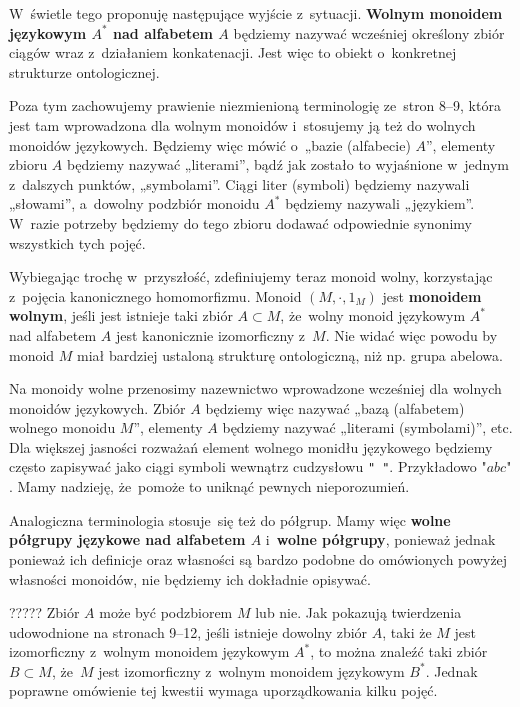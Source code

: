 \documentclass[a4paper,11pt]{article}
\begin{document}
W~świetle tego proponuję następujące wyjście z~sytuacji.
\textbf{Wolnym monoidem językowym $A^{ * }$ nad alfabetem $A$}
będziemy nazywać wcześniej określony zbiór ciągów wraz z~działaniem
konkatenacji. Jest więc to obiekt o~konkretnej strukturze
ontologicznej.

Poza tym zachowujemy prawienie niezmienioną terminologię ze~stron 8--9,
która jest tam wprowadzona dla wolnym monoidów i~stosujemy ją też do
wolnych monoidów językowych. Będziemy więc mówić o~„bazie (alfabecie) $A$”,
elementy zbioru $A$ będziemy nazywać „literami”, bądź jak zostało to
wyjaśnione w~jednym z~dalszych punktów, „symbolami”. Ciągi liter (symboli)
będziemy nazywali „słowami”, a~dowolny podzbiór monoidu $A^{ * }$ będziemy
nazywali „językiem”. W~razie potrzeby będziemy do tego zbioru dodawać
odpowiednie synonimy wszystkich tych pojęć.

Wybiegając trochę w~przyszłość, zdefiniujemy teraz monoid wolny, korzystając
z~pojęcia kanonicznego homomorfizmu. Monoid $( M, \cdot, 1_{ M } )$ jest
\textbf{monoidem wolnym}, jeśli jest istnieje taki zbiór $A \subset M$, że~wolny
monoid językowym $A^{ * }$ nad alfabetem $A$ jest kanonicznie izomorficzny
z~$M$. Nie widać więc powodu by monoid $M$ miał bardziej ustaloną strukturę
ontologiczną, niż np. grupa abelowa.

Na monoidy wolne przenosimy nazewnictwo wprowadzone wcześniej dla wolnych
monoidów językowych. Zbiór $A$ będziemy więc nazywać „bazą (alfabetem)
wolnego monoidu $M$”, elementy $A$ będziemy nazywać „literami (symbolami)”,
etc. Dla większej jasności rozważań element wolnego monidłu językowego
będziemy często zapisywać jako ciągi symboli wewnątrz cudzysłowu
\texttt{" "}. Przykładowo $\texttt{"} abc \texttt{"}$. Mamy nadzieję,
że~pomoże to uniknąć pewnych nieporozumień.

Analogiczna terminologia stosuje~się też do półgrup. Mamy więc \textbf{wolne
  półgrupy językowe nad alfabetem $A$} i~\textbf{wolne półgrupy}, ponieważ
jednak ponieważ ich definicje oraz własności są bardzo podobne do
omówionych powyżej własności monoidów, nie będziemy ich dokładnie opisywać.

????? Zbiór $A$ może być podzbiorem
$M$ lub nie. Jak pokazują twierdzenia udowodnione na stronach 9--12,
jeśli istnieje dowolny zbiór $A$, taki że $M$ jest izomorficzny
z~wolnym monoidem językowym $A^{ * }$, to można znaleźć taki zbiór
$B \subset M$, że~$M$ jest izomorficzny z~wolnym monoidem językowym
$B^{ * }$. Jednak poprawne omówienie tej kwestii wymaga uporządkowania
kilku pojęć.
\end{document}
